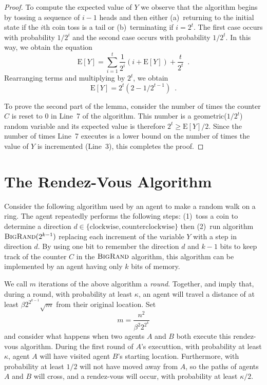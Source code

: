\documentclass[lotsofwhite]{patmorin}
\newcommand{\bigrand}{\textsc{BigRand}}
\newcommand{\E}{\mathrm{E}}
\begin{document}
\begin{proof}
To compute the expected value of $Y$ we observe that the algorithm
begins by tossing a sequence of $i-1$ heads and then either
(a)~returning to the initial state if the $i$th coin toss is a tail
or (b)~terminating if $i=2^t$.  The first case occurs with probability
$1/2^i$ and the second case occurs with probability $1/2^t$.
In this way, we obtain the equation
\[
   \E[Y] = \sum_{i=1}^{t} \frac{1}{2^i}\left(i + \E[Y]\right) +
\frac{t}{2^t} \enspace .
\]
Rearranging terms and multiplying by $2^{t}$, we obtain
\[
   \E[Y] = 2^t(2-1/2^{t-1}) \enspace .  
\]

To prove the second part of the lemma, consider the number of times
the counter $C$ is reset to $0$ in Line~7 of the algorithm.  This
number is a geometric($1/2^t$) random variable and its expected value
is therefore $2^t \ge \E[Y]/2$.  Since the number of times Line~7
executes is a lower bound on the number of times the value of $Y$ is
incremented (Line~3), this completes the proof.
\end{proof}

\section{The Rendez-Vous Algorithm}

Consider the following algorithm used by an agent to make a random
walk on a ring.  The agent repeatedly performs the following steps:
(1)~toss a coin to determine a direction
$d\in\{\mbox{clockwise},\mbox{counterclockwise}\}$ then (2)~run
algorithm $\bigrand(2^{k-1})$ replacing each increment of the variable
$Y$ with a step in direction $d$. By using one bit to remember the
direction $d$ and $k-1$ bits to keep track of the counter $C$ in the
$\bigrand$ algorithm, this algorithm can be implemented by an agent
having only $k$ bits of memory.

We call $m$ iterations of the above algorithm a \emph{round}.
Together,  and  imply that, during a
round, with probability at least $\kappa$, an agent will travel a
distance of at least $\beta 2^{2^{k-1}}\sqrt{m}$ from their original
location.  Set
\[
   m= \frac{n^2}{\beta^2 2^{2^k}}  
\]
and consider what happens when two agents $A$ and $B$ both execute
this rendez-vous algorithm.  During the first round of $A$'s
executtion, with probability at least $\kappa$, agent $A$ will have
visited agent $B$'s starting location. Furthermore, with probability
at least $1/2$ will not have moved away from $A$, so the paths of
agents $A$ and $B$ will cross, and a rendez-vous will occur, with
probability at least $\kappa/2$.
\end{document}
